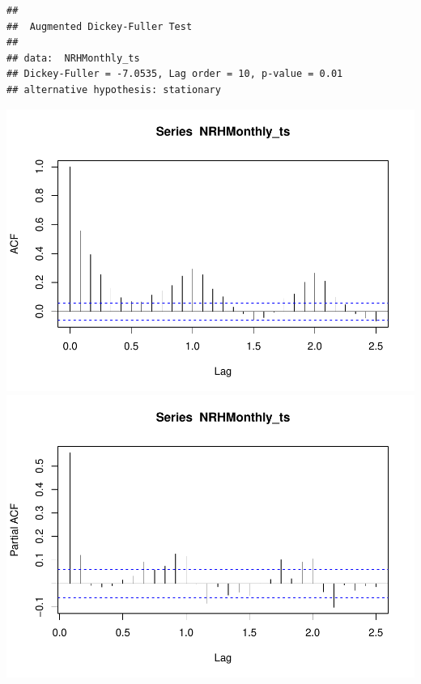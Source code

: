 \documentclass[12pt,]{article}
\begin{document}
\begin{verbatim}
## 
##  Augmented Dickey-Fuller Test
## 
## data:  NRHMonthly_ts
## Dickey-Fuller = -7.0535, Lag order = 10, p-value = 0.01
## alternative hypothesis: stationary
\end{verbatim}

\includegraphics{Project_Template_files/figure-latex/unnamed-chunk-6-5.pdf}
\includegraphics{Project_Template_files/figure-latex/unnamed-chunk-6-6.pdf}
\end{document}
